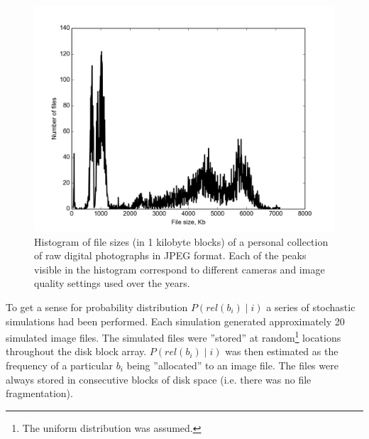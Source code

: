 \documentclass[10pt,a4paper]{article}
\begin{document}
\begin{figure}
  \centerline{\includegraphics[width=\textwidth]{jpeg-sizes}}
  \caption{Histogram of file sizes (in 1 kilobyte blocks) of a personal collection of raw digital photographs in JPEG format. Each of the peaks visible in the histogram correspond to different cameras and image quality settings used over the years.}
  \label{fig:jpeg-dist}
\end{figure}


To get a sense for probability distribution $P(rel(b_i) \mid i)$ a series of stochastic simulations had been performed. Each simulation generated approximately 20 simulated image files. The simulated files were ''stored'' at random\footnote{The uniform distribution was assumed.} locations throughout the disk block array. $P(rel(b_i) \mid i)$ was then estimated as the frequency of a particular $b_i$ being ''allocated'' to an image file. The files were always stored in consecutive blocks of disk space (i.e. there was no file fragmentation).
\end{document}

